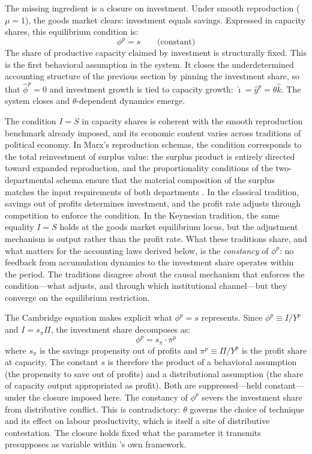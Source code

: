 \documentclass[11pt,a4paper]{article}
\begin{document}
The missing ingredient is a closure on investment. Under smooth reproduction ($\mu = 1$), the goods market clears: investment equals savings. Expressed in capacity shares, this equilibrium condition is:
%
\begin{equation}\label{eq:IS_closure}
	\phi^p = s \qquad \text{(constant)}
\end{equation}
%
The share of productive capacity claimed by investment is structurally fixed. This is the first behavioral assumption in the system. It closes the underdetermined accounting structure of the previous section by pinning the investment share, so that $\hat{\phi}^p = 0$ and investment growth is tied to capacity growth: $\hat{\imath} = \hat{y}^p = \theta\hat{k}$. The system closes and $\theta$-dependent dynamics emerge.

The condition $I = S$ in capacity shares is coherent with the smooth reproduction benchmark already imposed, and its economic content varies across traditions of political economy. In Marx's reproduction schemas, the condition corresponds to the total reinvestment of surplus value: the surplus product is entirely directed toward expanded reproduction, and the proportionality conditions of the two-departmental schema ensure that the material composition of the surplus matches the input requirements of both departments \citep{MarxKVII}. In the classical tradition, savings out of profits determines investment, and the profit rate adjusts through competition to enforce the condition. In the Keynesian tradition, the same equality $I = S$ holds at the goods market equilibrium locus, but the adjustment mechanism is output rather than the profit rate. What these traditions share, and what matters for the accounting laws derived below, is the \emph{constancy} of $\phi^p$: no feedback from accumulation dynamics to the investment share operates within the period. The traditions disagree about the causal mechanism that enforces the condition---what adjusts, and through which institutional channel---but they converge on the equilibrium restriction.

The Cambridge equation makes explicit what $\phi^p = s$ represents. Since $\phi^p \equiv I/Y^p$ and $I = s_\pi \Pi$, the investment share decomposes as:
%
\begin{equation}\label{eq:cambridge}
	\phi^p = s_\pi \cdot \pi^p
\end{equation}
%
where $s_\pi$ is the savings propensity out of profits and $\pi^p \equiv \Pi/Y^p$ is the profit share at capacity. The constant $s$ is therefore the product of a behavioral assumption (the propensity to save out of profits) and a distributional assumption (the share of capacity output appropriated as profit). Both are suppressed---held constant---under the closure imposed here. The constancy of $\phi^p$ severs the investment share from distributive conflict. This is contradictory: $\theta$ governs the choice of technique and its effect on labour productivity, which is itself a site of distributive contestation. The closure holds fixed what the parameter it transmits presupposes as variable within \citet{Shaikh2016}'s own framework.
\end{document}

